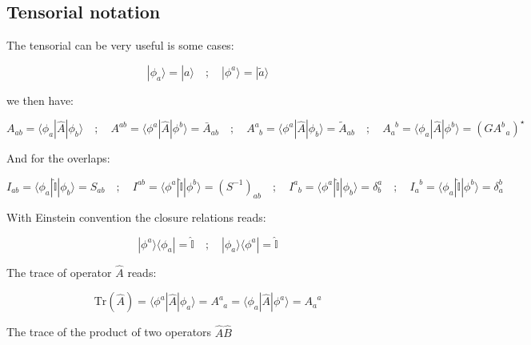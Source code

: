 \documentclass{article}
\newcommand{\bra}[1]{\langle #1|}
\newcommand{\ket}[1]{|#1\rangle}
\newcommand{\op}[1]{\hat{#1}}
\begin{document}
\smallskip


\noindent





\subsection{Tensorial notation}

\noindent
The tensorial can be very useful is some cases:

\[ \ket{\phi_a}=\ket{a} \quad ; \quad \ket{\phi^a}=\ket{\tilde{a}} \]

\noindent
we then have:

\[ A_{ab}=\bra{\phi_a}\op{A}\ket{\phi_b} \quad ; \quad  
A^{ab}=\bra{\phi^a}\op{A}\ket{\phi^b}=\bar{A}_{ab} \quad ; \quad  
A^{a}_{\; \;b}=\bra{\phi^a}\op{A}\ket{\phi_b}=\tilde{A}_{ab} \quad ; \quad 
A_{a}^{\; \;b}=\bra{\phi_a}\op{A}\ket{\phi^b}=( GA^{b}_{\; \;a})^{\star}
 \]

\noindent
And for the overlaps:

\[ I_{ab}=\bra{\phi_a}\op{\mathbb{I}}\ket{\phi_b}=S_{ab} \quad ; \quad  
I^{ab}=\bra{\phi^a}\op{\mathbb{I}}\ket{\phi^b}=(S^{-1})_{ab} \quad ; \quad  
I^{a}_{\; \;b}=\bra{\phi^a}\op{\mathbb{I}}\ket{\phi_b}=\delta^{a}_{b} \quad ; \quad 
I_{a}^{\; \;b}=\bra{\phi_a}\op{\mathbb{I}}\ket{\phi^b}=\delta^{b}_{a}
 \]

\noindent
With Einstein convention the closure relations reads:

\[ \ket{\phi^a}\bra{\phi_a}=\op{\mathbb{I}} \quad ; \quad  \ket{\phi_a}\bra{\phi^a}=\op{\mathbb{I}}\]

\noindent
The trace of operator $\op{A}$ reads:

\[ \text{Tr}(\op{A})= \bra{\phi^a}\op{A}\ket{\phi_a}=A^{a}_{\; \;a}= \bra{\phi_a}\op{A}\ket{\phi^a}=A_{a}^{\; \;a}\]


\noindent
The trace of the product of two operators $\op{A}\op{B}$
\end{document}

